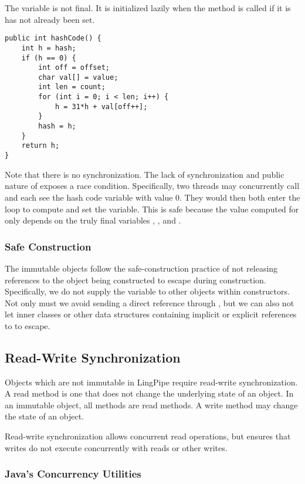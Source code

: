The  variable is not final.  It is initialized lazily when
the  method is called if it is has not already been
set.
%
\begin{verbatim}
public int hashCode() {
    int h = hash;
    if (h == 0) {
        int off = offset;
        char val[] = value;
        int len = count;
        for (int i = 0; i < len; i++) {
            h = 31*h + val[off++];
        }
        hash = h;
    }
    return h;
}
\end{verbatim}
%
Note that there is no synchronization.  The lack of synchronization
and public nature of  exposes a race condition.
Specifically, two threads may concurrently call  and
each see the hash code variable  with value 0.  They would
then both enter the loop to compute and set the variable.  This is
safe because the value computed for  only depends on
the truly final variables , , and .


\subsubsection{Safe Construction}

The immutable objects follow the safe-construction practice of not
releasing references to the object being constructed to escape during
construction.  Specifically, we do not supply the  variable
to other objects within constructors.  Not only must we avoid sending
a direct reference through , but we can also not let inner
classes or other data structures containing implicit or explicit
references to  to escape.


\subsection{Read-Write Synchronization}

Objects which are not immutable in LingPipe require read-write
synchronization.  A read method is one that does not change the
underlying state of an object.  In an immutable object, all methods
are read methods.  A write method may change the state of an object.

Read-write synchronization allows concurrent read operations, but ensures
that writes do not execute concurrently with reads or other writes.

\subsubsection{Java's Concurrency Utilities}

